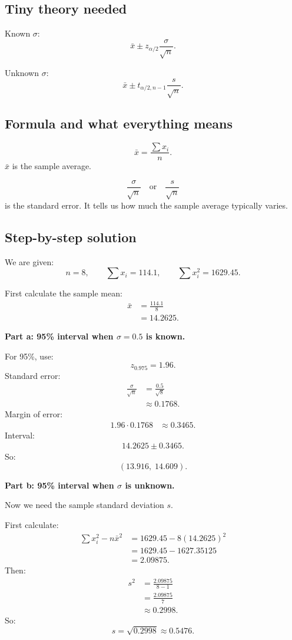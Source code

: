 \documentclass[11pt,a4paper]{article}
\begin{document}
\subsection*{Tiny theory needed}
Known \(\sigma\):
\[
\bar{x}\pm z_{\alpha/2}\frac{\sigma}{\sqrt{n}}.
\]

Unknown \(\sigma\):
\[
\bar{x}\pm t_{\alpha/2,n-1}\frac{s}{\sqrt{n}}.
\]

\subsection*{Formula and what everything means}
\[
\bar{x}=\frac{\sum x_i}{n}.
\]
\(\bar{x}\) is the sample average.

\[
\frac{\sigma}{\sqrt{n}}
\quad \text{or} \quad
\frac{s}{\sqrt{n}}
\]
is the standard error. It tells us how much the sample average typically varies.

\subsection*{Step-by-step solution}
We are given:
\[
n=8,\qquad \sum x_i=114.1,\qquad \sum x_i^2=1629.45.
\]

First calculate the sample mean:
\begin{align*}
\bar{x}
&=\frac{114.1}{8}\\
&=14.2625.
\end{align*}

\textbf{Part a: 95\% interval when \(\sigma=0.5\) is known.}

For 95\%, use:
\[
z_{0.975}=1.96.
\]
Standard error:
\begin{align*}
\frac{\sigma}{\sqrt{n}}
&=\frac{0.5}{\sqrt{8}}\\
&\approx 0.1768.
\end{align*}
Margin of error:
\begin{align*}
1.96\cdot 0.1768&\approx 0.3465.
\end{align*}
Interval:
\begin{align*}
14.2625\pm 0.3465.
\end{align*}
So:
\[
(13.916,\;14.609).
\]

\textbf{Part b: 95\% interval when \(\sigma\) is unknown.}

Now we need the sample standard deviation \(s\).

First calculate:
\begin{align*}
\sum x_i^2-n\bar{x}^2
&=1629.45-8(14.2625)^2\\
&=1629.45-1627.35125\\
&=2.09875.
\end{align*}
Then:
\begin{align*}
s^2
&=\frac{2.09875}{8-1}\\
&=\frac{2.09875}{7}\\
&\approx 0.2998.
\end{align*}
So:
\[
s=\sqrt{0.2998}\approx 0.5476.
\]
\end{document}
